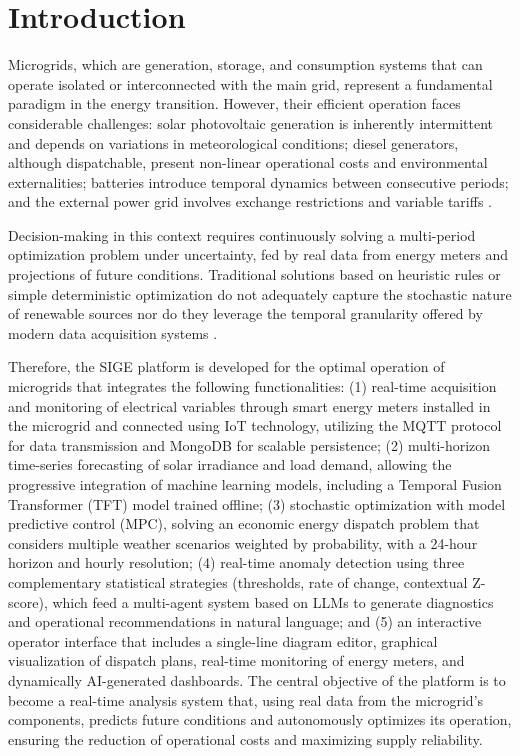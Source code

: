 \documentclass[journal,article,submit,pdftex,moreauthors]{Definitions/mdpi}
\begin{document}
\section{Introduction}

Microgrids, which are generation, storage, and consumption systems that can operate isolated or interconnected with the main grid, represent a fundamental paradigm in the energy transition. However, their efficient operation faces considerable challenges: solar photovoltaic generation is inherently intermittent and depends on variations in meteorological conditions; diesel generators, although dispatchable, present non-linear operational costs and environmental externalities; batteries introduce temporal dynamics between consecutive periods; and the external power grid involves exchange restrictions and variable tariffs \cite{ref-alternar}.

Decision-making in this context requires continuously solving a multi-period optimization problem under uncertainty, fed by real data from energy meters and projections of future conditions. Traditional solutions based on heuristic rules or simple deterministic optimization do not adequately capture the stochastic nature of renewable sources nor do they leverage the temporal granularity offered by modern data acquisition systems \cite{ref-carrasco}.

Therefore, the SIGE platform is developed for the optimal operation of microgrids that integrates the following functionalities: (1) real-time acquisition and monitoring of electrical variables through smart energy meters installed in the microgrid and connected using IoT technology, utilizing the MQTT protocol for data transmission and MongoDB for scalable persistence; (2) multi-horizon time-series forecasting of solar irradiance and load demand, allowing the progressive integration of machine learning models, including a Temporal Fusion Transformer (TFT) model trained offline; (3) stochastic optimization with model predictive control (MPC), solving an economic energy dispatch problem that considers multiple weather scenarios weighted by probability, with a 24-hour horizon and hourly resolution; (4) real-time anomaly detection using three complementary statistical strategies (thresholds, rate of change, contextual Z-score), which feed a multi-agent system based on LLMs to generate diagnostics and operational recommendations in natural language; and (5) an interactive operator interface that includes a single-line diagram editor, graphical visualization of dispatch plans, real-time monitoring of energy meters, and dynamically AI-generated dashboards. The central objective of the platform is to become a real-time analysis system that, using real data from the microgrid's components, predicts future conditions and autonomously optimizes its operation, ensuring the reduction of operational costs and maximizing supply reliability.
\end{document}
